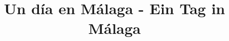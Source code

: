 \documentclass[a4paper, pagesize, DIV=14, fontsize=10pt, parskip=half, oneside, BCOR=5mm]{scrartcl}
\begin{document}
\title{Un día en Málaga - Ein Tag in Málaga}
\date{}

\maketitle

\newcommand{\rn}[1]{\Rnode{#1}}
\newcommand{\rl}[2]{\ncline[linestyle=solid,arrows=->,nodesepA=0.5pt,linecolor=gray, strokeopacity=0.5]{#1}{#2}}
\newcommand{\sidenote}[1]{\marginpar[#1]{#1}}



\end{document}
